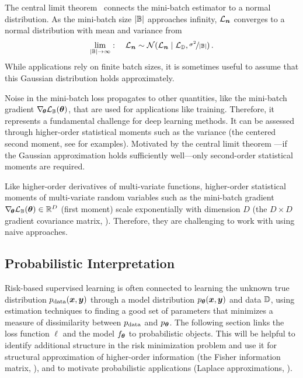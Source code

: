 The central limit theorem~\cite{fischer2010history} connects the mini-batch
estimator to a normal distribution. As the mini-batch size $|{\mathbb{B}}|$ approaches
infinity, ${\mathcal{L}}_{{\bm{n}}}$ converges to a normal distribution with mean and variance
from
\begin{align}\label{eq:background::CentralLimitTheorem}
  \lim_{|\sB| \to \infty}:
  \quad
  \gL_{\vn}
  \sim
  \gN(
  \giventhat{
  \gL_{\vn}
  }
  {
  \gL_{\sD},
  \nicefrac{\sigma^{2}}{|\sB|}
  }
  )\,.
\end{align}
While applications rely on finite batch sizes, it is sometimes useful to assume
that this Gaussian distribution holds approximately.

Noise in the mini-batch loss propagates to other quantities, like the mini-batch
gradient $\nabla_{\!{{\bm{\theta}}}}{\mathcal{L}}_{{\mathbb{B}}}({\bm{\theta}})$, that are used for applications like
training. Therefore, it represents a fundamental challenge for deep learning
methods. It can be assessed through higher-order statistical moments such as the
variance (the centered second moment, see
 for
examples). Motivated by the central limit theorem
---if the Gaussian approximation holds
sufficiently well---only second-order statistical moments are required.

Like higher-order derivatives of multi-variate functions, higher-order
statistical moments of multi-variate random variables such as the mini-batch
gradient $\nabla_{\!{{\bm{\theta}}}}{\mathcal{L}}_{{\mathbb{B}}}({\bm{\theta}}) \in {\mathbb{R}}^D$ (first moment) scale
exponentially with dimension $D$ (\eg the $D \times D$ gradient covariance
matrix, ). Therefore, they are
challenging to work with using naive approaches.

\subsection{Probabilistic
  Interpretation}\label{sec:background::ProbabilisticInterpretation}

Risk-based supervised learning is often connected to learning the unknown true
distribution $p_{\mathrm{data}}({\bm{x}}, {\bm{y}})$ through a model distribution $p_{{\bm{\theta}}}({\bm{x}},
{\bm{y}})$ and data ${\mathbb{D}}$, using estimation techniques to finding a good set of
parameters that minimizes a measure of dissimilarity between $p_{\mathrm{data}}$ and
$p_{{\bm{\theta}}}$. The following section links the loss function $\ell$ and the
model $f_{{\bm{\theta}}}$ to probabilistic objects. This will be helpful to identify
additional structure in the risk minimization problem and use it for structural
approximation of higher-order information (\eg the Fisher information matrix,
), and to motivate probabilistic
applications (\eg Laplace approximations,
).

